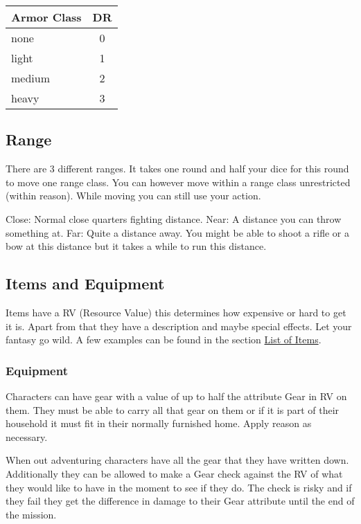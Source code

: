 \documentclass[11pt]{article}
\begin{document}
{\begin{multicols}{2}[]
\begin{center}
\begin{tabular}{l|c}
\textbf{Armor Class} & \textbf{DR}\\
\hline
none & 0\\
light & 1\\
medium & 2\\
heavy & 3\\
\end{tabular}
\end{center}

\subsection{Range}
\label{sec:orgf9b2c21}
There are 3 different ranges. It takes one round and half your dice for this round to move one range class. You can however move within a range class unrestricted (within reason). While moving you can still use your action.

Close: Normal close quarters fighting distance.
Near: A distance you can throw something at.
Far: Quite a distance away. You might be able to shoot a rifle or a bow at this distance but it takes a while to run this distance.

\subsection{Items and Equipment}
\label{sec:orgb424dfa}

Items have a RV (Resource Value) this determines how expensive or hard to get it is. Apart from that they have a description and maybe special effects. Let your fantasy go wild. A few examples can be found in the section \hyperref[sec:orgbe4412b]{List of Items}.

\subsubsection{Equipment}
\label{sec:org49f146b}
Characters can have gear with a value of up to half the attribute Gear in RV on them. They must be able to carry all that gear on them or if it is part of their household it must fit in their normally furnished home. Apply reason as necessary.

When out adventuring characters have all the gear that they have written down. Additionally they can be allowed to make a Gear check against the RV of what they would like to have in the moment to see if they do. The check is risky and if they fail they get the difference in damage to their Gear attribute until the end of the mission.


\end{multicols}}
\end{document}
